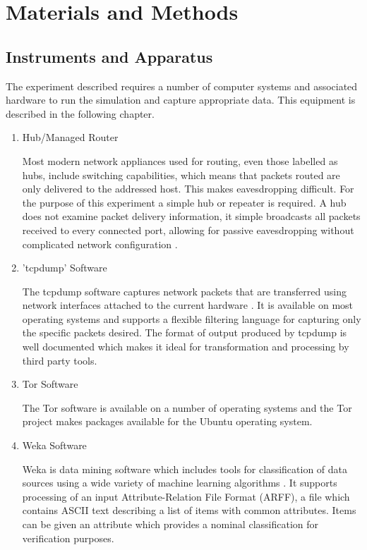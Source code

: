 
\chapter{Materials and Methods}

\section{Instruments and Apparatus}

The experiment described requires a number of computer systems and associated
hardware to run the simulation and capture appropriate data. This equipment is
described in the following chapter.

\begin{enumerate}
  \item Hub/Managed Router

  Most modern network appliances used for routing, even those labelled as hubs,
  include switching capabilities, which means that packets routed are only
  delivered to the addressed host. This makes eavesdropping difficult. For
  the purpose of this experiment a simple hub or repeater is required. A hub
  does not examine packet delivery information, it simple broadcasts all packets
  received to every connected port, allowing for passive eavesdropping without
  complicated network configuration \parencite{website:hub-reference}.

  \item 'tcpdump' Software

  The tcpdump software captures network packets that are transferred using
  network interfaces attached to the current hardware \parencite{:2009cr}.  It is
  available on most operating systems and supports a flexible filtering language
  for capturing only the specific packets desired. The format of output produced
  by tcpdump is well documented \parencite{:nx} which makes it ideal for
  transformation and processing by third party tools.

  \item Tor Software

  The Tor software is available on a number of operating systems and the Tor
  project makes packages available for the Ubuntu operating system.

  \item Weka Software

  Weka is data mining software which includes tools for classification of data
  sources using a wide variety of machine learning algorithms
  \parencite{Hall:2009p7662}. It supports processing of an input
  Attribute-Relation File Format (ARFF), a file which contains ASCII text
  describing a list of items with common attributes. Items can be given an
  attribute which provides a nominal classification for verification purposes.


\end{enumerate}
